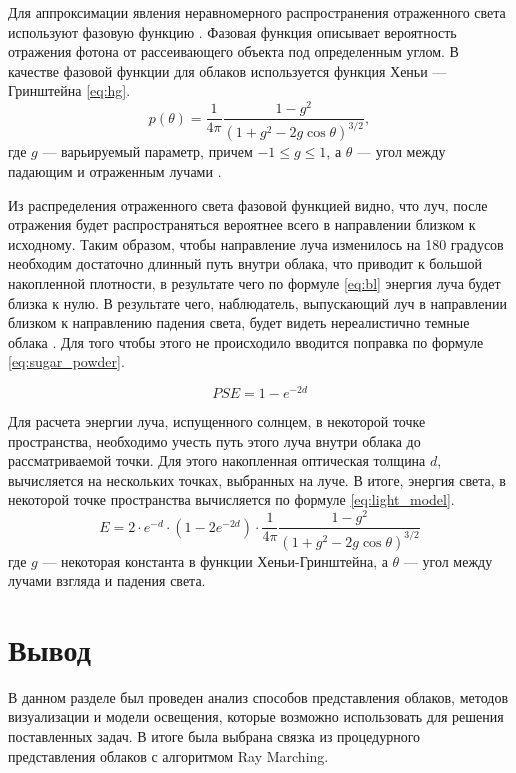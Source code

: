 Для аппроксимации явления неравномерного распространения отраженного света используют фазовую функцию \cite{partmedia, hzd, frostbite, clouds}.
Фазовая функция описывает вероятность отражения фотона от рассеивающего объекта под определенным углом. 
В качестве фазовой функции для облаков используется функция Хеньи --- Гринштейна \eqref{eq:hg}.  
\begin{equation}
	\label{eq:hg}
	p(\theta) = \frac{1}{4\pi} \frac{1 - g^2}{(1 + g^2 - 2g\cos \theta)^{3/2}},
\end{equation}
где $ g $ --- варьируемый параметр, причем $ -1 \leq g \leq 1 $, а $\theta$ --- угол между падающим и отраженным лучами \cite{clouds}.


Из распределения отраженного света фазовой функцией видно, что луч, после отражения будет распространяться вероятнее всего в направлении близком к исходному. 
Таким образом, чтобы направление луча изменилось на 180 градусов необходим достаточно длинный путь внутри облака, что приводит к большой накопленной плотности, в результате чего по формуле \ref{eq:bl} энергия луча будет близка к нулю. 
В результате чего, наблюдатель, выпускающий луч в направлении близком к направлению падения света, будет видеть нереалистично темные облака \cite{hzd}. Для того чтобы этого не происходило вводится поправка по формуле \eqref{eq:sugar_powder}.

\begin{equation}
	\label{eq:sugar_powder}
	PSE = 1 - e ^ {-2 d}
\end{equation}

Для расчета энергии луча, испущенного солнцем, в некоторой точке пространства, необходимо учесть путь этого луча внутри облака до рассматриваемой точки.
Для этого накопленная оптическая толщина $d$, вычисляется на нескольких точках, выбранных на луче.
В итоге, энергия света, в некоторой точке пространства вычисляется по формуле \eqref{eq:light_model}.
\begin{equation}
	\label{eq:light_model}
	E = 2 \cdot e ^ {-d} \cdot (1 - 2 e ^ {-2d}) \cdot \frac{1}{4\pi} \frac{1 - g^2}{(1 + g^2 - 2g\cos \theta)^{3/2}}
\end{equation}
где $ g $ --- некоторая константа в функции Хеньи-Гринштейна, а $ \theta $ --- угол между лучами взгляда и падения света.


\section*{Вывод}

В данном разделе был проведен анализ способов представления облаков, методов визуализации и модели освещения, которые возможно использовать для решения поставленных задач. В итоге была выбрана связка из процедурного представления облаков с алгоритмом Ray Marching.

